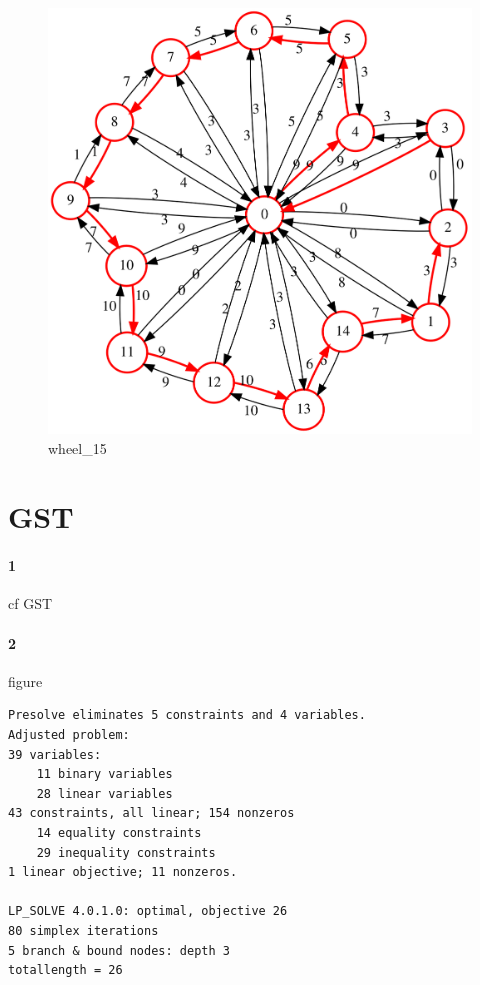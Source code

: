\documentclass{article}
\begin{document}
\begin{figure}[H]
  \centering
  \includegraphics[scale=0.3]{graph/GST_wheel_15}
  \caption{wheel\_15}
\end{figure}

\section{GST}

\paragraph{1}

cf GST

\paragraph{2}

figure

\begin{lstlisting}
Presolve eliminates 5 constraints and 4 variables.
Adjusted problem:
39 variables:
	11 binary variables
	28 linear variables
43 constraints, all linear; 154 nonzeros
	14 equality constraints
	29 inequality constraints
1 linear objective; 11 nonzeros.

LP_SOLVE 4.0.1.0: optimal, objective 26
80 simplex iterations
5 branch & bound nodes: depth 3
totallength = 26
\end{lstlisting}
\end{document}
